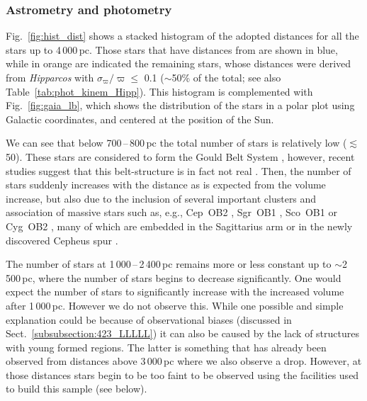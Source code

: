 \documentclass{aa}
\newcommand{\ls}{\mbox{$\lesssim$}}
\begin{document}

\subsubsection{Astrometry and photometry}
\label{subsubsection:422_FFFF}

Fig.~\ref{fig:hist_dist} shows a stacked histogram of the adopted distances for all the stars up to 4\,000\,pc. Those stars that have distances from \citet{2021AJ....161..147B} are shown in blue, while in orange are indicated the remaining stars, whose distances were derived from \textit{Hipparcos} with $\sigma_{\varpi}/\varpi \leq$ 0.1 ($\sim$50\% of the total; see also Table~\ref{tab:phot_kinem_Hipp}). This histogram is complemented with Fig.~\ref{fig:gaia_lb}, which shows the distribution of the stars in a polar plot using Galactic coordinates, and centered at the position of the Sun.

We can see that below 700\,--\,800\,pc the total number of stars is relatively low ($\ls$\,50). These stars are considered to form the Gould Belt System \citep{1997FCPh...18....1P}, however, recent studies suggest that this belt-structure is in fact not real \citep[see, e.g.][]{2015A&A...584A..26B,2018A&A...620A.172Z}. Then, the number of stars suddenly increases with the distance as is expected from the volume increase, but also due to the inclusion of several important clusters and association of massive stars such as, e.g., Cep~OB2 \citep[$l\approx100\degr$, $d\approx$\,900\,pc,][]{2002AJ....124.1585C}, Sgr~OB1 \citep[$l\approx5\degr$, $d$\,\ls\,1\,400\,pc,][]{2020Ap&SS.365..112M}, Sco~OB1 \citep[$l\approx340\degr$, $d\approx$\,1\,600\,pc,][]{2016A&A...596A..82D,2020MNRAS.495.1349Y} or Cyg~OB2 \citep[$l\approx80\degr$, $d$\,\ls\,1\,700\,pc,][]{2019MNRAS.484.1838B,1991AJ....101.1408M}, many of which are embedded in the Sagittarius arm or in the newly discovered Cepheus spur \citep{2021MNRAS.504.2968P}. 

The number of stars at 1\,000\,--\,2\,400\,pc remains more or less constant up to $\sim$2\,500\,pc, where the number of stars begins to decrease significantly. One would expect the number of stars to significantly increase with the increased volume after 1\,000\,pc. However we do not observe this. While one possible and simple explanation could be because of observational biases (discussed in Sect.~\ref{subsubsection:423_LLLLL}) it can also be caused by the lack of structures with young formed regions. The latter is something that has already been observed from distances above 3\,000\,pc where we also observe a drop. However, at those distances stars begin to be too faint to be observed using the facilities used to build this sample (see below).
\end{document}
